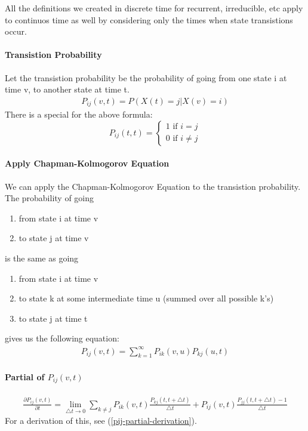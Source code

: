 All the definitions we created in discrete time for recurrent, irreducible, etc
apply to continuos time as well by considering only the times when state
transistions occur.


\paragraph{Transistion Probability} Let the transistion probability be the
probability of going from one state i at time v, to another state at time t.
\begin{equation*} \begin{split}
	P_{ij}(v,t) = P(X(t)=j | X(v) = i)
\end{split} \end{equation*}
There is a special for the above formula:
\begin{equation*} 
	P_{ij}(t,t) =
	\begin{cases}
		1 \mbox{ if } i = j\\
		0 \mbox{ if } i \ne j
	\end{cases}
\end{equation*}


\paragraph{Apply Chapman-Kolmogorov Equation} We can apply the
Chapman-Kolmogorov Equation to the transistion probability. The probability of going
\begin{enumerate}
	\item from state i at time v
	\item to state j at time v
\end{enumerate}
is the same as going
\begin{enumerate}
	\item from state i at time v
	\item to state k at some intermediate time u (summed over all possible k's)
	\item to state j at time t 
\end{enumerate}
gives us the following equation:
\begin{equation*} \begin{split}
	P_{ij}(v,t) = \sum_{k=1}^\infty P_{ik}(v,u)P_{kj}(u,t)
\end{split} \end{equation*}
 
\paragraph{Partial of $P_{ij}(v,t)$} \label{pij-partial-derivation-context}
\begin{equation*} \begin{split}
	\frac{\partial P_{ij}(v,t)}{\partial t}
	= \lim_{\triangle t \to 0}
	\sum_{k \ne j} P_{ik}(v,t) \frac{P_{kj}(t,t+\triangle t)}{\triangle t}
		+ P_{ij}(v,t)\frac{P_{jj}(t,t+\triangle t) -1} {\triangle t}
\end{split} \end{equation*}
For a derivation of this, see (\ref{pij-partial-derivation}).

